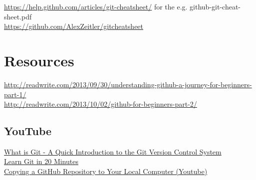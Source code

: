 \documentclass[11pt,a4paper]{article}
\begin{document}
\noindent
\href{https://help.github.com/articles/git-cheatsheet}{https://help.github.com/articles/git-cheatsheet/}
for the e.g. github-git-cheat-sheet.pdf \\

\noindent
\href{https://github.com/AlexZeitler/gitcheatsheet}{https://github.com/AlexZeitler/gitcheatsheet}






\section*{Resources}

\noindent
\href{http://readwrite.com/2013/09/30/understanding-github-a-journey-for-beginners-part-1/}{http://readwrite.com/2013/09/30/understanding-github-a-journey-for-beginners-part-1/}\\

\noindent
\href{http://readwrite.com/2013/10/02/github-for-beginners-part-2/}{http://readwrite.com/2013/10/02/github-for-beginners-part-2/}\\


    \subsection*{YouTube}
    \noindent
    \href{https://www.youtube.com/watch?v=OqmSzXDrJBk}{What is Git - A Quick Introduction to the Git Version Control System}\\
    
    \noindent
    \href{https://www.youtube.com/watch?v=Y9XZQO1n_7c}{Learn Git in 20 Minutes}\\
    
    \noindent
    \href{https://www.youtube.com/watch?v=O72FWNeO-xY}{Copying a GitHub Repository to Your Local Computer (Youtube)}\\
    
\end{document}
